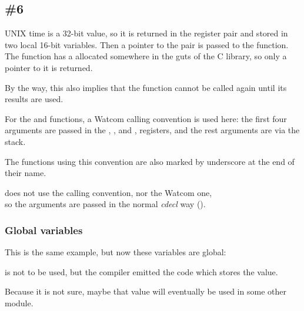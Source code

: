 \subsection{\Example{} \#6}






UNIX time is a 32-bit value, so it is returned in the  register pair and stored in two local 16-bit variables.
Then a pointer to the pair is passed to the
 function.
The  function has a  
allocated somewhere in the guts of the C library, so only a pointer to it is returned. 

By the way, this also implies that the function cannot be called again until its results are used.

For the  and  
functions, a Watcom calling convention is used here:
the first four arguments are passed in the , ,  and , 
registers, and the rest arguments are via the stack.

The functions using this convention are also marked by underscore at the end of their name.

 does not use the  calling convention, nor the Watcom one,\\ %
so the arguments are passed in the normal \emph{cdecl} way ().

\subsubsection{Global variables}

This is the same example, but now these variables are global:





 is not to be used, but the compiler emitted the code which stores the value.

Because it is not sure, maybe that value will eventually be used in some other module.

